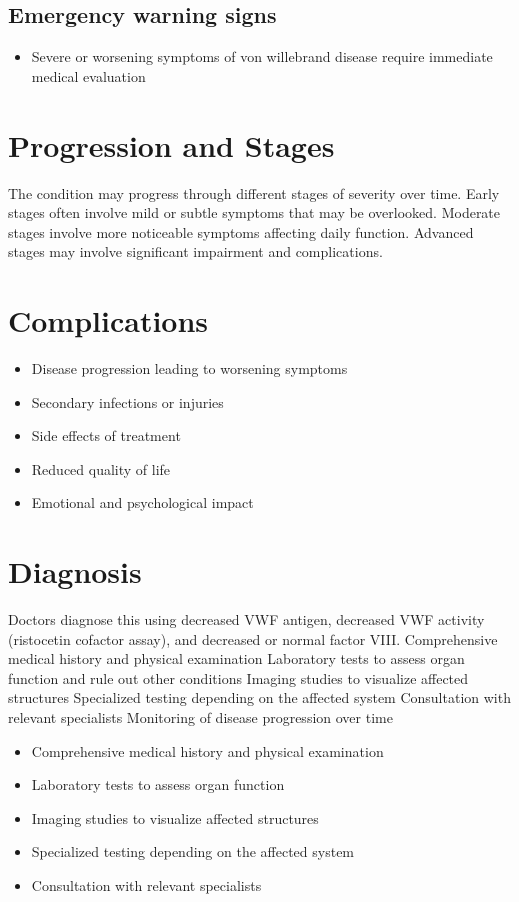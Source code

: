 \subsection{Emergency warning signs}
\begin{itemize}[noitemsep]
  \item Severe or worsening symptoms of von willebrand disease require immediate medical evaluation
\end{itemize}
\section{Progression and Stages}
The condition may progress through different stages of severity over time. Early stages often involve mild or subtle symptoms that may be overlooked. Moderate stages involve more noticeable symptoms affecting daily function. Advanced stages may involve significant impairment and complications.
\section{Complications}
\begin{itemize}[noitemsep]
  \item Disease progression leading to worsening symptoms
  \item Secondary infections or injuries
  \item Side effects of treatment
  \item Reduced quality of life
  \item Emotional and psychological impact
\end{itemize}
\section{Diagnosis}
Doctors diagnose this using decreased VWF antigen, decreased VWF activity (ristocetin cofactor assay), and decreased or normal factor VIII. Comprehensive medical history and physical examination Laboratory tests to assess organ function and rule out other conditions Imaging studies to visualize affected structures Specialized testing depending on the affected system Consultation with relevant specialists Monitoring of disease progression over time

\begin{itemize}[noitemsep]
  \item Comprehensive medical history and physical examination
  \item Laboratory tests to assess organ function
  \item Imaging studies to visualize affected structures
  \item Specialized testing depending on the affected system
  \item Consultation with relevant specialists
\end{itemize}
